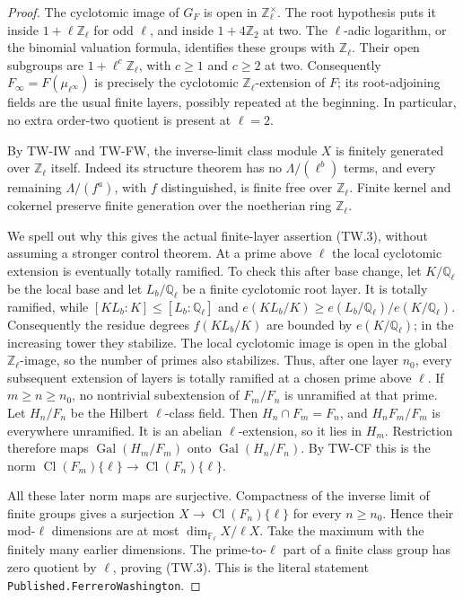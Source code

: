 \begin{proof}
The cyclotomic image of $G_F$ is open in
$\mathbb Z_\ell^\times$.  The root hypothesis puts it inside
$1+\ell\mathbb Z_\ell$ for odd $\ell$, and inside
$1+4\mathbb Z_2$ at two.  The $\ell$-adic logarithm, or the binomial
valuation formula, identifies these groups with $\mathbb Z_\ell$.
Their open subgroups are $1+\ell^c\mathbb Z_\ell$, with $c\ge1$
and $c\ge2$ at two.  Consequently
$F_\infty=F(\mu_{\ell^\infty})$ is precisely the cyclotomic
$\mathbb Z_\ell$-extension of $F$; its root-adjoining fields are
the usual finite layers, possibly repeated at the beginning.
In particular, no extra order-two quotient is present at $\ell=2$.

By TW-IW and TW-FW, the inverse-limit class module $X$ is finitely
generated over $\mathbb Z_\ell$ itself.  Indeed its structure theorem
has no $\Lambda/(\ell^b)$ terms, and every remaining
$\Lambda/(f^a)$, with $f$ distinguished, is finite free over
$\mathbb Z_\ell$.  Finite kernel and cokernel preserve finite
generation over the noetherian ring $\mathbb Z_\ell$.

We spell out why this gives the actual finite-layer assertion
(TW.3), without assuming a stronger control theorem.
At a prime above $\ell$ the local cyclotomic extension is eventually
totally ramified.  To check this after base change, let $K/\mathbb
Q_\ell$ be the local base and let $L_b/\mathbb Q_\ell$ be a finite
cyclotomic root layer.  It is totally ramified, while
$[KL_b:K]\le[L_b:\mathbb Q_\ell]$ and
$e(KL_b/K)\ge e(L_b/\mathbb Q_\ell)/e(K/\mathbb Q_\ell)$.
Consequently the residue degrees $f(KL_b/K)$ are bounded by
$e(K/\mathbb Q_\ell)$; in the increasing tower they stabilize.
The local cyclotomic image is open in the global
$\mathbb Z_\ell$-image, so the number of primes also stabilizes.
Thus, after one layer $n_0$,
every subsequent extension of layers is totally ramified at a
chosen prime above $\ell$.  If $m\ge n\ge n_0$, no nontrivial
subextension of $F_m/F_n$ is unramified at that prime.
Let $H_n/F_n$ be the Hilbert $\ell$-class field.  Then
$H_n\cap F_m=F_n$, and $H_nF_m/F_m$ is everywhere unramified.
It is an abelian $\ell$-extension, so it lies in $H_m$.
Restriction therefore maps
$\operatorname{Gal}(H_m/F_m)$ onto
$\operatorname{Gal}(H_n/F_n)$.  By TW-CF this is the norm
$\operatorname{Cl}(F_m)\{\ell\}\to
\operatorname{Cl}(F_n)\{\ell\}$.

All these later norm maps are surjective.  Compactness of the
inverse limit of finite groups gives a surjection
$X\to\operatorname{Cl}(F_n)\{\ell\}$ for every $n\ge n_0$.
Hence their mod-$\ell$ dimensions are at most
$\dim_{\mathbb F_\ell}X/\ell X$.  Take the maximum with the
finitely many earlier dimensions.  The prime-to-$\ell$ part of a
finite class group has zero quotient by $\ell$, proving (TW.3).
This is the literal statement
\texttt{Published.FerreroWashington}.


\end{proof}

